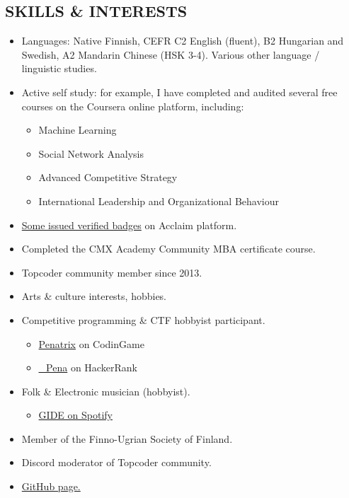 \documentclass[margin, 10pt]{res} %
\begin{document}
\begin{resume}
\section{SKILLS \& INTERESTS}
\begin{itemize} \itemsep -2pt
\item Languages: Native Finnish, CEFR C2 English (fluent), B2 Hungarian and Swedish, A2 Mandarin Chinese (HSK 3-4). Various other language / linguistic studies.
\item Active self study: for example, I have completed and audited several free courses on the Coursera online platform, including:
  \begin{itemize} \itemsep -2pt
  \item Machine Learning
  \item Social Network Analysis
  \item Advanced Competitive Strategy
  \item International Leadership and Organizational Behaviour
  \end{itemize}
\item \href{https://www.youracclaim.com/users/pentti-sunila/badges}{Some issued verified badges} on Acclaim platform.
\item Completed the CMX Academy Community MBA certificate course.
\item Topcoder community member since 2013.
\item Arts \& culture interests, hobbies.
\item Competitive programming \& CTF hobbyist participant.
\begin{itemize}
	\item \href{https://www.codingame.com/profile/e3a213a1df3e0d739af5ddb7dbfe73a07564915}{Penatrix} on CodinGame
	\item \href{https://www.hackerrank.com/_Pena}{\_Pena} on HackerRank
\end{itemize}
\item Folk \& Electronic musician (hobbyist).
\begin{itemize}
	\item \href{https://open.spotify.com/artist/4e6oG8yxaiw4UHudKs86G0}{GIDE on Spotify}
\end{itemize}
\item Member of the Finno-Ugrian Society of Finland.
\item Discord moderator of Topcoder community.
\item \href{https://github.com/gingerdeer}{GitHub page.}
\end{itemize}



\end{resume}
\end{document}
